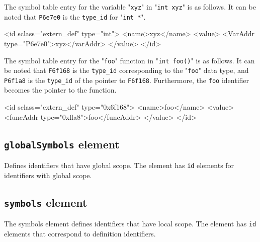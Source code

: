 The symbol table entry for the variable "{\tt xyz}" in "{\tt int xyz}" is as follows. It can be noted that {\tt P6e7e0} is the {\tt type\_id} for "{\tt int *}".
\vspace{2mm}

\begin{XcodeMLExample}
  <id sclass="extern_def" type="int"> 
   <name>xyz</name>
   <value>
     <VarAddr type="P6e7e0">xyz</varAddr>
   </value>
  </id>
\end{XcodeMLExample}

The symbol table entry for the "{\tt foo}" function in "{\tt int foo()}" is as follows. It can be noted that {\tt F6f168} is the {\tt type\_id} corresponding to the "{\tt foo}" data type, and {\tt P6f1a8} is the {\tt type\_id} of the pointer to {\tt F6f168}. Furthermore, the {\tt foo} identifier becomes the pointer to the function.
\vspace{2mm}

\begin{XcodeMLExample}
  <id sclass="extern_def" type="0x6f168">
   <name>foo</name>
   <value>
    <funcAddr type="0xfla8">foo</funcAddr>
   </value>
  </id>
\end{XcodeMLExample}


\subsection{ {\tt globalSymbols} element}

Defines identifiers that have global scope. The element has {\tt id} elements for identifiers with global scope.

\subsection{ {\tt symbols} element}

The symbols element defines identifiers that have local scope. The element has {\tt id} elements that correspond to definition identifiers. 


